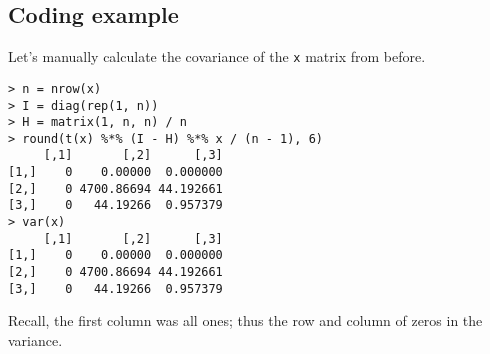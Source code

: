 \subsection{Coding example}
Let's manually calculate the covariance of the \texttt{x} matrix from before.

\begin{verbatim}
> n = nrow(x)
> I = diag(rep(1, n))
> H = matrix(1, n, n) / n
> round(t(x) %*% (I - H) %*% x / (n - 1), 6)
     [,1]       [,2]      [,3]
[1,]    0    0.00000  0.000000
[2,]    0 4700.86694 44.192661
[3,]    0   44.19266  0.957379
> var(x)
     [,1]       [,2]      [,3]
[1,]    0    0.00000  0.000000
[2,]    0 4700.86694 44.192661
[3,]    0   44.19266  0.957379
\end{verbatim}
Recall, the first column was all ones; thus the row and column of zeros in the variance.





